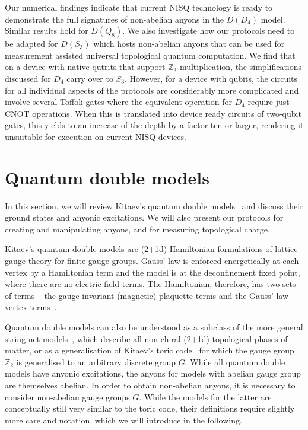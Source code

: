 \documentclass[a4paper,twocolumn,11pt]{quantumarticle}
\begin{document}
Our numerical findings indicate that current NISQ technology is ready to demonstrate the full signatures of non-abelian anyons in the $D(D_4)$ model. Similar results hold for $D(Q_8)$. We also investigate how our protocols need to be adapted for $D(S_3)$ which hosts non-abelian anyons that can be used for measurement assisted universal topological quantum computation. We find that on a device with native qutrits that support $\mathbb Z_3$ multiplication, the simplifications discussed for $D_4$ carry over to $S_3$. However, for a device with qubits, the circuits for all individual aspects of the protocols are considerably more complicated and involve several Toffoli gates where the equivalent operation for $D_4$ require just CNOT operations. When this is translated into device ready circuits of two-qubit gates, this yields to an increase of the depth by a factor ten or larger, rendering it unsuitable for execution on current NISQ devices.


\section{Quantum double models}\label{sec:qm_double}

In this section, we will review Kitaev's quantum double models~\cite{Kitaev_2003} and discuss their ground states and anyonic excitations. We will also present our protocols for creating and manipulating anyons, and for measuring topological charge. 

Kitaev's quantum double models are (2+1d) Hamiltonian formulations of lattice gauge theory for finite gauge groups. Gauss' law is enforced energetically at each vertex by a Hamiltonian term and the model is at the deconfinement fixed point, where there are no electric field terms.
The Hamiltonian, therefore, has two sets of terms -- the gauge-invariant (magnetic) plaquette terms and the Gauss' law vertex terms~\cite{cui2018topological, Kitaev_2003}. 

Quantum double models can also be understood as a subclass of the more general string-net models~\cite{Levin_2005}, which describe all non-chiral (2+1d) topological phases of matter, or as a generalisation of Kitaev's toric code~\cite{Kitaev_2003} for which the gauge group $\mathbb Z_2$ is generalised to an arbitrary discrete group $G$. While all quantum double models have anyonic excitations, the anyons for models with abelian gauge group are themselves abelian. In order to obtain non-abelian anyons, it is necessary to consider non-abelian gauge groups $G$. While the models for the latter are conceptually still very similar to the toric code, their definitions require slightly more care and notation, which we will introduce in the following. 
\end{document}
